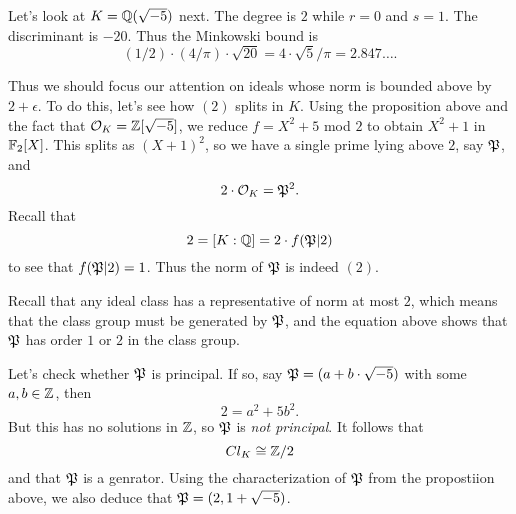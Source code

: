 \begin{example}
  Let's look at $K = \mathbb{Q}(\sqrt{-5})$ next.
  The degree is $2$ while $r = 0$ and $s = 1$.
  The discriminant is $-20$.
  Thus the Minkowski bound is
  \[ (1/2) \cdot (4/\pi) \cdot \sqrt{20} = 4 \cdot \sqrt{5} / \pi = 2.847\ldots. \]

  Thus we should focus our attention on ideals whose norm is bounded above by $2 + \epsilon$.
  To do this, let's see how $(2)$ splits in $K$.
  Using the proposition above and the fact that $\mathcal{O}_{K} = \mathbb{Z}[\sqrt{-5}]$, we reduce $f = X^{2} + 5$ mod $2$ to obtain $X^{2} + 1$ in $\mathbb{F}_{2}[X]$.
  This splits as $(X+1)^{2}$, so we have a single prime lying above $2$, say $\mathfrak{P}$, and
  \[ 2 \cdot \mathcal{O}_{K} = \mathfrak{P}^{2}. \]
  Recall that
  \[ 2 = [K:\mathbb{Q}] = 2 \cdot f(\mathfrak{P}|2) \]
  to see that $f(\mathfrak{P}|2) = 1$.
  Thus the norm of $\mathfrak{P}$ is indeed $(2)$.

  Recall that any ideal class has a representative of norm at most $2$, which means that the class group must be generated by $\mathfrak{P}$, and the equation above shows that $\mathfrak{P}$ has order $1$ or $2$ in the class group.

  Let's check whether $\mathfrak{P}$ is principal.
  If so, say $\mathfrak{P} = (a + b \cdot \sqrt{-5})$ with some $a,b \in \mathbb{Z}$, then
  \[ 2 = a^{2} + 5 b^{2}. \]
  But this has no solutions in $\mathbb{Z}$, so $\mathfrak{P}$ is \emph{not principal}.
  It follows that
  \[ Cl_{K} \cong \mathbb{Z}/2 \]
  and that $\mathfrak{P}$ is a genrator.
  Using the characterization of $\mathfrak{P}$ from the propostiion above, we also deduce that $\mathfrak{P} = (2,1 + \sqrt{-5})$.
\end{example}

